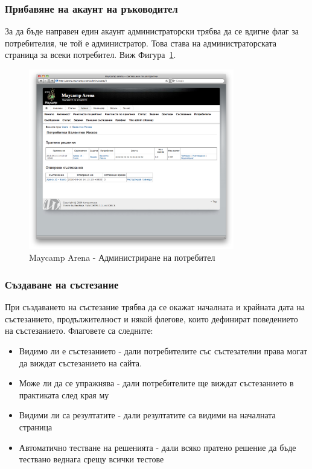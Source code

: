 \documentclass[a4paper,12pt]{article}
\begin{document}
  \subsubsection{Прибавяне на акаунт на ръководител}
  За да бъде направен един акаунт администраторски трябва да се вдигне флаг за потребителия, че той е администратор. Това става на администраторската страница за всеки потребител. Виж Фигура~\ref{arena_admin_user}.

  \begin{figure}[ht]
    \begin{center}
      \includegraphics[width=0.8\textwidth]{maycamp_arena_admin_user.png}
    \end{center}
    \caption{Maycamp Arena - Администриране на потребител}
    \label{arena_admin_user}
  \end{figure}
  
  \subsubsection{Създаване на състезание}
  
  При създаването на състезание трябва да се окажат началната и крайната дата на състезанието, продължителност и някой флегове, които дефинират поведението на състезанието. Флаговете са следните:
  \begin{itemize}
    \item Видимо ли е състезанието - дали потребителите със състезателни права могат да виждат състезанието на сайта.
    \item Може ли да се упражнява - дали потребителите ще виждат състезанието в практиката след края му
    \item Видими ли са резултатите - дали резултатите са видими на началната страница
    \item Автоматично тестване на решенията - дали всяко пратено решение да бъде тествано веднага срещу всички тестове
  \end{itemize}
\end{document}
